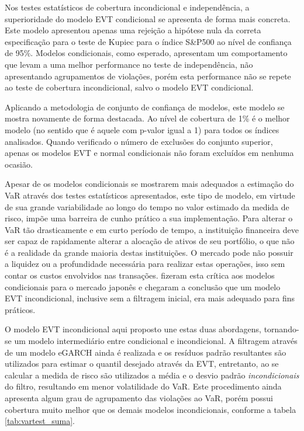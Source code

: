 \documentclass[1p]{elsarticle}
\theoremstyle{definition}
\begin{document}
Nos testes estatísticos de cobertura incondicional e independência, a superioridade do modelo EVT condicional se apresenta de forma mais concreta. Este modelo apresentou apenas uma rejeição a hipótese nula da correta especificação para o teste de Kupiec para o índice S\&P500 ao nível de confiança de 95\%. Modelos condicionais, como esperado, apresentam um comportamento que levam a uma melhor performance no teste de independência, não apresentando agrupamentos de violações, porém esta performance não se repete ao teste de cobertura incondicional, salvo o modelo EVT condicional.

Aplicando a metodologia de conjunto de confiança de modelos, este modelo se mostra novamente de forma destacada. Ao nível de cobertura de 1\% é o melhor modelo (no sentido que é aquele com p-valor igual a 1) para todos os índices analisados. Quando verificado o número de exclusões do conjunto superior, apenas os modelos EVT e normal condicionais não foram excluídos em nenhuma ocasião.

Apesar de os modelos condicionais se mostrarem mais adequados a estimação do VaR através dos testes estatísticos apresentados, este tipo de modelo, em virtude de sua grande variabilidade ao longo do tempo no valor estimado da medida de risco, impõe uma barreira de cunho prático a sua implementação. Para alterar o VaR tão drasticamente e em curto período de tempo, a instituição financeira deve ser capaz de rapidamente alterar a alocação de ativos de seu portfólio, o que não é a realidade da grande maioria destas instituições. O mercado pode não possuir a liquidez ou a profundidade necessária para realizar estas operações, isso sem contar os custos envolvidos nas transações. \cite{Danielsson2000} fizeram esta crítica aos modelos condicionais para o mercado japonês e chegaram a conclusão que um modelo EVT incondicional, inclusive sem a filtragem inicial, era mais adequado para fins práticos.

O modelo EVT incondicional aqui proposto une estas duas abordagens, tornando-se um modelo intermediário entre condicional e incondicional. A filtragem através de um modelo eGARCH ainda é realizada e os resíduos padrão resultantes são utilizados para estimar o quantil desejado através da EVT, entretanto, ao se calcular a medida de risco são utilizados a média e o desvio padrão \emph{incondicionais} do filtro, resultando em menor volatilidade do VaR. Este procedimento ainda apresenta algum grau de agrupamento das violações ao VaR, porém possui cobertura muito melhor que os demais modelos incondicionais, conforme a tabela \ref{tab:vartest_suma}.
\end{document}
